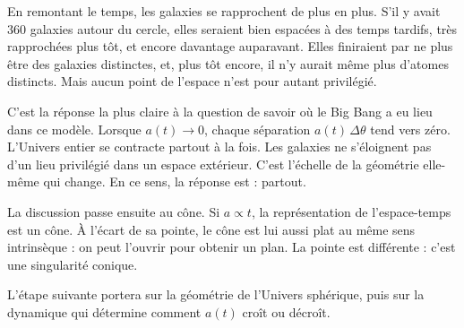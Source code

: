 En remontant le temps, les galaxies se rapprochent de plus en plus. S’il y avait \(360\) galaxies autour du cercle, elles seraient bien espacées à des temps tardifs, très rapprochées plus tôt, et encore davantage auparavant. Elles finiraient par ne plus être des galaxies distinctes, et, plus tôt encore, il n’y aurait même plus d’atomes distincts. Mais aucun point de l’espace n’est pour autant privilégié.

C’est la réponse la plus claire à la question de savoir où le Big Bang a eu lieu dans ce modèle. Lorsque \(a(t)\to 0\), chaque séparation \(a(t)\,\Delta\theta\) tend vers zéro. L’Univers entier se contracte partout à la fois. Les galaxies ne s’éloignent pas d’un lieu privilégié dans un espace extérieur. C’est l’échelle de la géométrie elle-même qui change. En ce sens, la réponse est : partout.

\begin{classroomqa}\end{classroomqa}

La discussion passe ensuite au cône. Si \(a\propto t\), la représentation de l’espace-temps est un cône. À l’écart de sa pointe, le cône est lui aussi plat au même sens intrinsèque : on peut l’ouvrir pour obtenir un plan. La pointe est différente : c’est une singularité conique.

L’étape suivante portera sur la géométrie de l’Univers sphérique, puis sur la dynamique qui détermine comment \(a(t)\) croît ou décroît.